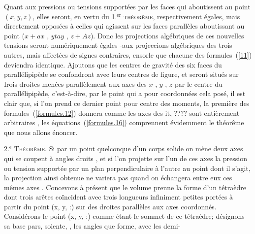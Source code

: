 \documentclass[11pt, twoside, leqno]{article}
\renewcommand{\eqref}[1]{(\ref{#1})}
\begin{document}
Quant aux pressions ou tensions supportées par les faces qui aboutissent au point $(x,y,z)$, elles seront, en vertu du 1.${^{\text{er}}}$ \textsc{théorême}, respectivement égales, mais directement opposées à celles qui agissent sur les faces parallèles aboutissant au point ($x + ax$ , $y tay$ , $z + Az$). Donc les projections algébriques de ces nouvelles tensions seront numériquement égales -aux projeccions algébriques des trois autres, mais affectées de signes contraires, ensorle que chacune des formules~\eqref{11} deviendra identique. Ajoutons que les centres de gravité des six faces du parallélipipède se confondront avec leurs centres de figure, et seront situés sur Irois droites menées parallèlement aux axes des $x$ , $y$ , $z$ par le centre du parallélipipède, c'est\hbox{-}à\hbox{-}dire, par le point qui a pour coordonnées cela posé, il est clair que, si l'on prend ce dernier point pour centre des moments, la première des formules~\eqref{formules.12} donnera comme les axes des it, ???? sont entièrement arbitraires , les équations~\eqref{formules.16} comprennent évidemment le théorême que nous allons énoncer.

2.${^{\text{e}}}$ \textsc{Théorême}.
Si par un point quelconque d'un corps solide on mène deux axes qui se coupent à angles droits , et si l'on projette sur l'un de ces axes la pression ou tension supportée par un plan perpendiculaire à l'autre au point dont il s'agit, la projection ainsi obtenue ne variera pas quand on échangera entre eux ces mêmes axes . Concevons à présent que le volume prenne la forme d'un tétraèdre dont trois arêtes coïncident avec trois longueurs infiniment petites portées à partir du point (x, y, :) sur des droites parallèles aux axes coordonnés. Considérons le point (x, y, :) comme étant le sommet de ce tétraèdre; désignons sa base pars, soiente, , les angles que forme, avec les demi-
\end{document}
